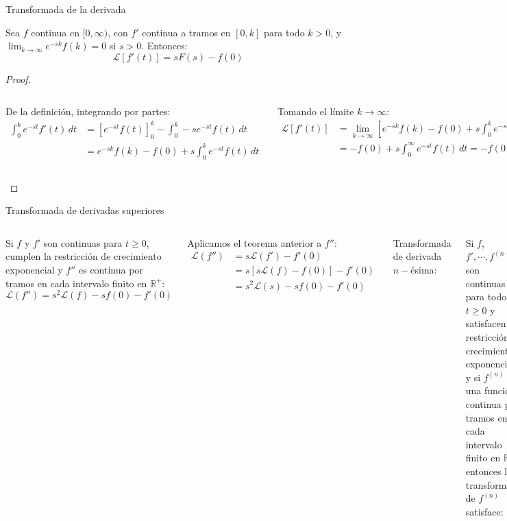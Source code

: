 \documentclass[9pt, aspectratio=169]{beamer}
\begin{document}
\begin{frame}{Transformada de la derivada}
\begin{theorem}[Transformada de $f'$]
    Sea $f$ continua en $[0, \infty)$, con $f'$ continua a tramos en $[0, k]$ para todo $k > 0$, y $\lim_{k \rightarrow \infty} e^{-s k} f(k) = 0$ si $s > 0$. Entonces:
    \[ \mathscr{L}[f'(t)] = s F(s) - f(0) \]
\end{theorem}

{ \small
\begin{proof} 
    \vspace{1em}
\begin{columns}[t]
De la definición, integrando por partes:
\begin{align*}
    \int_0^k e^{-st} f'(t) \, dt &= \left[ e^{-st} f(t) \right]_0^k - \int_0^k -s e^{-st} f(t) \, dt \\
                                 &= e^{-sk}f(k) - f(0) + s \int_0^k e^{-st} f(t) \, dt
\end{align*}

Tomando el límite $k \rightarrow \infty$:
\begin{align*}
    \mathscr{L}[f'(t)] &= \lim_{k \rightarrow \infty} \left[ e^{-sk} f(k) - f(0) + s \int_0^k e^{-st} f(t) \, dt \right] \\
                       &= -f(0) + s \int_0^{\infty} e^{-st} f(t) \, dt = -f(0) + s F(s)
\end{align*}
\end{columns}
\end{proof}
}
\end{frame}

\begin{frame}{Transformada de derivadas superiores}
    \begin{columns}[t]
\cx
Si $f$ y $f'$ son continuas para $t \geq 0$, cumplen la restricción de crecimiento exponencial y $f''$ es continua por tramos en cada intervalo finito en $\mathbb{R}^{+}$:
\[ \mathscr{L}(f'') = s^2 \mathscr{L}(f) - s f(0) - f'(0) \]

Aplicamos el teorema anterior a $f''$:
\begin{align*}
    \mathscr{L}(f'') &= s \mathscr{L}(f') - f'(0) \\
                     &= s [s \mathscr{L}(f) - f(0)] - f'(0) \\
                     &= s^2 \mathscr{L}(s) - s f(0) - f'(0)
\end{align*}
\pause

\cx
Transformada de derivada $n-$ésima:

Si $f$, $f', \cdots, f^{(n-1)}$ son continuas para todo $t \geq 0$ y satisfacen la restricción de crecimiento exponencial, y si $f^{(n)}$ es una función continua por tramos en cada intervalo finito en $\mathbb{R}^+$, entonces la transformada de $f^{(n)}$ satisface:

\begin{multline*}
    \mathscr{L}[f^{(n)}] = s^n \mathscr{L}(f) - s^{n-1} f(0) \\
- s^{n-2} f'(0) - \cdots f^{(n-1)}(0) 
\end{multline*}
\end{columns}
\end{frame}
\end{document}
